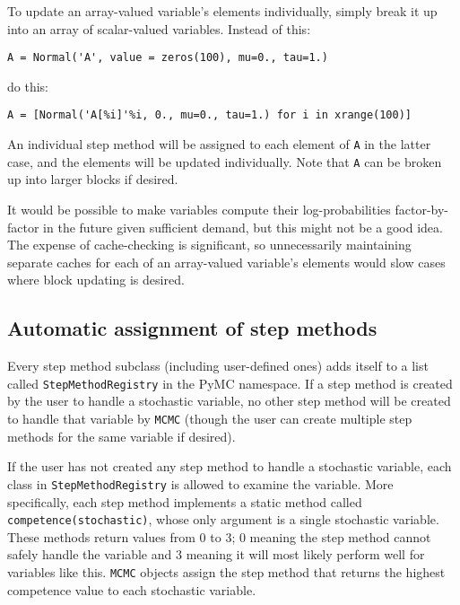 To update an array-valued variable's elements individually, simply break it up into an array of scalar-valued variables. Instead of this:
\begin{verbatim}
A = Normal('A', value = zeros(100), mu=0., tau=1.)    
\end{verbatim}
do this:
\begin{verbatim}
A = [Normal('A[%i]'%i, 0., mu=0., tau=1.) for i in xrange(100)]
\end{verbatim}
An individual step method will be assigned to each element of \texttt{A} in the latter case, and the elements will be updated individually. Note that \texttt{A} can be broken up into larger blocks if desired.

It would be possible to make variables compute their log-probabilities factor-by-factor in the future given sufficient demand, but this might not be a good idea. The expense of cache-checking is significant, so unnecessarily maintaining separate caches for each of an array-valued variable's elements would slow cases where block updating is desired. 

\subsection{Automatic assignment of step methods} 
Every step method subclass (including user-defined ones) adds itself to a list called \texttt{StepMethodRegistry} in the PyMC namespace. If a step method is created by the user to handle a stochastic variable, no other step method will be created to handle that variable by \texttt{MCMC} (though the user can create multiple step methods for the same variable if desired). 

If the user has not created any step method to handle a stochastic variable, each class in \texttt{StepMethodRegistry} is allowed to examine the variable. More specifically, each step method implements a static method called \texttt{competence(stochastic)}, whose only argument is a single stochastic variable. These methods return values from 0 to 3; 0 meaning the step method cannot safely handle the variable and 3 meaning it will most likely perform well for variables like this. \texttt{MCMC} objects assign the step method that returns the highest competence value to each stochastic variable.